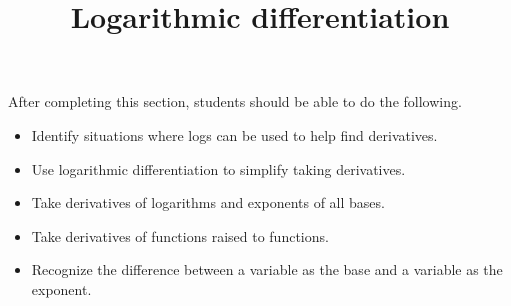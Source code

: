 \documentclass{ximera}
\title{Logarithmic differentiation}
\begin{document}
\begin{abstract}
\end{abstract}

\maketitle

\begin{sectionOutcomes}

After completing this section, students should be able to do the following.

\begin{itemize}
	\item Identify situations where logs can be used to help find derivatives.
	\item Use logarithmic differentiation to simplify taking derivatives.
	\item Take derivatives of logarithms and exponents of all bases.
	\item Take derivatives of functions raised to functions.
	\item Recognize the difference between a variable as the base and a variable as the exponent.
\end{itemize}

\end{sectionOutcomes}
\end{document}
